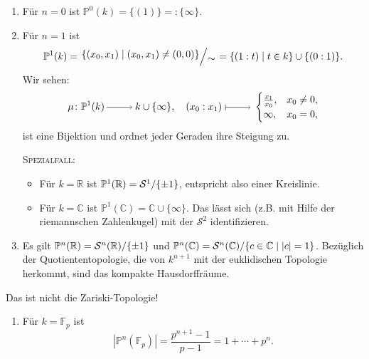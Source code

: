 \documentclass[a4paper,12pt,index=toc]{scrbook}
\theoremstyle{keinenummern} %
\def\C{\mathbb{C}}
\def\P{\mathbb{P}}
\def\S{\mathcal{S}}
\newcommand{\FF}{\mathbb{F}}
\newcommand{\card}[1]{|#1|}
\newcommand{\set}[1]{\ensuremath{\mathbb{#1}}}
\newcommand{\R}{\set{R}}
\begin{document}
\begin{bsp}\label{2.2.2}\begin{enumerate}
\item Für $n=0$ ist $\P^{0}(k) = \{(1)\} =: \{\infty\}$.
\item Für $n=1$ ist \begin{equation*}\P^{1}(k)=\Quotient{\{(x_{0},x_{1})\mid(x_{0},x_{1})\neq(0,0)\}}{\sim}=\{(1:t)\mid t\in k\}\cup\{(0:1)\}.\end{equation*} \vspace*{-6pt}Wir sehen:\vspace*{-12pt}
\begin{equation*}\mu\colon\P^{1}(k)\ra k\cup\{\infty\},\quad(x_{0}:x_{1})\mapsto\begin{cases}\frac{x_{1}}{x_{0}},&x_{0}\neq0,\\\infty,&x_{0}=0,\\\end{cases}\end{equation*}
ist eine Bijektion und ordnet jeder Geraden ihre Steigung zu.

{\scshape Spezialfall:}\begin{itemize}\item Für $k=\R$ ist $\P^{1}(\R)=\Quotient{\S^{1}}{\{\pm1\}}$, entspricht also einer Kreislinie.
\item Für $k=\C$ ist $\P^{1}(\C)=\C\cup\{\infty\}$. Das lässt sich (z.B. mit Hilfe der riemannschen Zahlenkugel) mit der $\S^{2}$ identifizieren.
\end{itemize}
\item Es gilt $\P^{n}(\R)=\Quotient{\S^{n}(\R)}{\{\pm1\}}$ und $\P^{n}(\C)=\Quotient{\S^{n}(\C)}{\{c\in\C\mid |c|=1\}}$. Bezüglich der Quotiententopologie, die von $k^{n+1}$ mit der euklidischen Topologie herkommt, sind das kompakte Hausdorffräume.
\end{enumerate}
\begin{w}Das ist nicht die Zariski-Topologie!\end{w}
\begin{enumerate}[resume]
\item Für $k=\FF_{p}$ ist
\begin{equation*}\card{\P^{n}(\FF_{p})}=\frac{p^{n+1}-1}{p-1}=1+\dotsm+p^{n}.\end{equation*}
\end{enumerate}\end{bsp}
\end{document}
